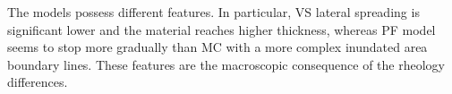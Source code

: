 \documentclass{article}
\begin{document}

The models possess different features. In particular, VS lateral spreading is significant lower and the material reaches higher thickness, whereas PF model seems to stop more gradually than MC with a more complex inundated area boundary lines. These features are the macroscopic consequence of the rheology differences.
\end{document}
